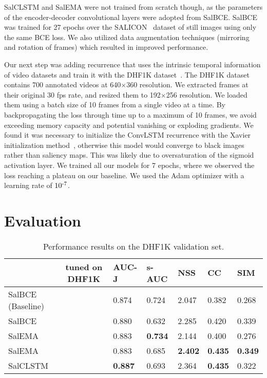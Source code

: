 \documentclass{bmvc2k}
\newcommand{\cmark}{\ding{51}}\newcommand{\xmark}{\ding{55}}
\begin{document}
SalCLSTM and SalEMA were not trained from scratch though, as the parameters of the encoder-decoder convolutional layers were adopted from SalBCE.
SalBCE was trained for 27 epochs over the SALICON~\cite{SALICON} dataset of still images using only the same BCE loss. We also utilized data augmentation techniques (mirroring and rotation of frames) which resulted in improved performance.



Our next step was adding recurrence that uses the intrinsic temporal information of video datasets and train it with the DHF1K dataset~\cite{Wang2018a}. 
The DHF1K dataset \cite{Wang2018a} contains 700 annotated videos at 640$\times$360 resolution. We extracted frames at their original 30 fps rate, and resized them to 192$\times$256 resolution. We loaded them using a batch size of 10 frames from a single video at a time. By backpropagating the loss through time up to a maximum of 10 frames, we avoid exceeding memory capacity and potential vanishing or exploding gradients. We found it was necessary to initialize the ConvLSTM recurrence with the Xavier initialization method~\cite{Xavier_Initialization}, otherwise this model would converge to black images rather than saliency maps. This was likely due to oversaturation of the sigmoid activation layer. We trained all our models for 7 epochs, where we observed the loss reaching a plateau on our baseline. We used the Adam optimizer \cite{Adam} with a learning rate of $10\textsuperscript{-7}$.


\section{Evaluation}

\begin{table}[t]

\begin{center}
\begin{tabularx}{\textwidth}{Xclllll}
\toprule
 & tuned on DHF1K & AUC-J  &s-AUC & NSS 	&  CC  & SIM\\
\midrule
SalBCE (Baseline) &\xmark & 0.874 & 0.724 &	2.047 & 0.382 & 0.268 \\
SalBCE &\cmark & 0.880 & 0.632 &	2.285 & 0.420 & 0.339 \\
SalEMA  &\xmark & 0.883 & \textbf{0.734} & 2.144 & 0.400 & 0.276\\
SalEMA &\cmark & 0.883 & 0.685 & \textbf{2.402 }& \textbf{0.435 }& \textbf{0.349}\\
SalCLSTM &\cmark&\textbf{ 0.887} & 0.693 & 2.364 & \textbf{0.435 }& 0.322  \\

\bottomrule
\end{tabularx}
\end{center}

\caption{Performance results on the DHF1K validation set.}
\label{tab:SalEMAvsSalCLSTM}
\end{table}
\end{document}
